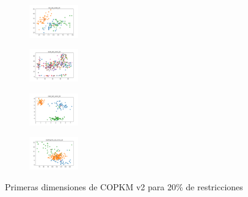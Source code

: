 \begin{figure}[H]
\begin{subfigure}
    \end{subfigure}
    \hfill
    \begin{subfigure}
        \centering
        \includegraphics[width=0.234\textwidth]{img/hs-ls-v2/iris_set_const_20_3773969821_clust.png}
    \end{subfigure}
    \hfill
    \begin{subfigure}
        \centering
        \includegraphics[width=0.234\textwidth]{img/hs-ls-v2/ecoli_set_const_20_3773969821_clust.png}
    \end{subfigure}
    \hfill
    \begin{subfigure}
        \centering
        \includegraphics[width=0.234\textwidth]{img/hs-ls-v2/rand_set_const_20_3773969821_clust.png}
    \end{subfigure}
    \hfill
    \begin{subfigure}
        \centering
        \includegraphics[width=0.234\textwidth]{img/hs-ls-v2/newthyroid_set_const_20_3773969821_clust.png}
    \end{subfigure}
    \caption{Primeras dimensiones de COPKM v2 para 20\% de restricciones}
\end{figure}

\vspace*{\fill}
\newpage